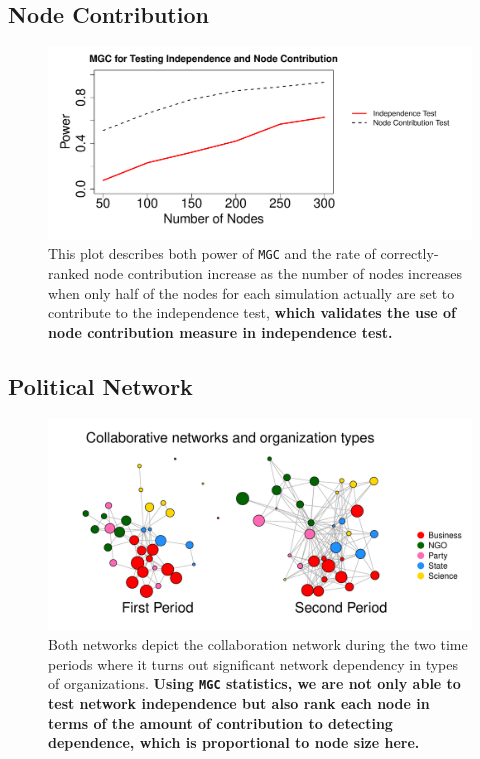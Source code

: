 \documentclass[12pt]{article}
\begin{document}
\subsection*{Node Contribution}

\begin{figure}
	\centering
		\includegraphics[width=0.6\linewidth, height = 0.3\linewidth]{../Figure/nodecontri.pdf}
	\caption{This plot describes both power of \texttt{MGC} and the rate of correctly-ranked node contribution increase as the number of nodes increases when only half of the nodes for each simulation actually are set to contribute to the independence test, \textbf{which validates the use of node contribution measure in independence test.}}
	\label{fig:contribution}
\end{figure}


\subsection*{Political Network}

\begin{figure}[H]
	\centering
		\includegraphics[width=\linewidth]{../Figure/two_politics.pdf}
	\caption{Both networks depict the collaboration network during the two time periods where it turns out significant network dependency in types of organizations. \textbf{Using \texttt{MGC} statistics, we are not only able to test network independence but also rank each node in terms of the amount of contribution to detecting dependence, which is proportional to node size here.}}
	\label{fig:politics}
\end{figure}
\end{document}
